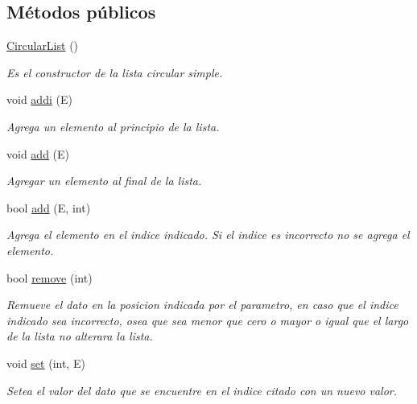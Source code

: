 \subsection*{Métodos públicos}
\begin{DoxyCompactItemize}
\item 
\hypertarget{classCircularList_aad23571a808ede6fc0432dca645ab2ca}{\hyperlink{classCircularList_aad23571a808ede6fc0432dca645ab2ca}{Circular\-List} ()}\label{classCircularList_aad23571a808ede6fc0432dca645ab2ca}

\begin{DoxyCompactList}\small\item\em Es el constructor de la lista circular simple. \end{DoxyCompactList}\item 
void \hyperlink{classCircularList_a6de0a0af406c738b95b0a6d898b69f8e}{addi} (E)
\begin{DoxyCompactList}\small\item\em Agrega un elemento al principio de la lista. \end{DoxyCompactList}\item 
void \hyperlink{classCircularList_a892b493309f36fb083fdd257388cfa36}{add} (E)
\begin{DoxyCompactList}\small\item\em Agregar un elemento al final de la lista. \end{DoxyCompactList}\item 
bool \hyperlink{classCircularList_af184d3ac2e3bba683a44a6cc19392b12}{add} (E, int)
\begin{DoxyCompactList}\small\item\em Agrega el elemento en el indice indicado. Si el indice es incorrecto no se agrega el elemento. \end{DoxyCompactList}\item 
bool \hyperlink{classCircularList_a4a6acfd818a0ae9055957ec80258c60a}{remove} (int)
\begin{DoxyCompactList}\small\item\em Remueve el dato en la posicion indicada por el parametro, en caso que el indice indicado sea incorrecto, osea que sea menor que cero o mayor o igual que el largo de la lista no alterara la lista. \end{DoxyCompactList}\item 
void \hyperlink{classCircularList_aa54489e11ad76bf929f92b1dce97a3a3}{set} (int, E)
\begin{DoxyCompactList}\small\item\em Setea el valor del dato que se encuentre en el indice citado con un nuevo valor. \end{DoxyCompactList}\item 

\end{DoxyCompactItemize}
